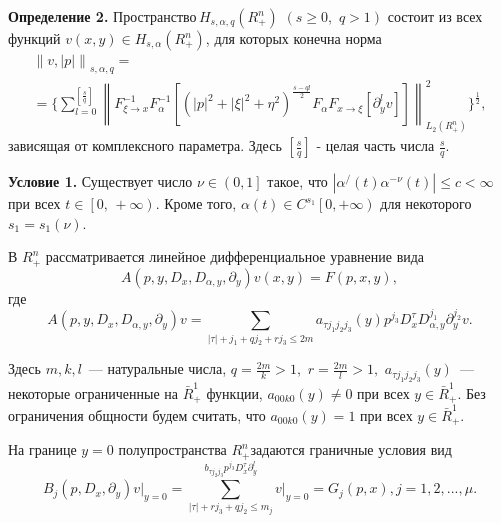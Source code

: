 \textbf{Определение 2.} Пространство$\,H_{s,\alpha ,q} (R_ + ^n )\,\,(s
\geqslant 0,\,\,q > 1)$ состоит из всех функций $v(x,y) \in H_{s,\alpha } (R_ + ^n
)$, для которых конечна норма
\begin{multline*}
\left\| {v,\left| p \right|} \right\|_{s,\alpha ,q} =
\\=
\{\sum\limits_{l =
0}^{[\frac{s}{q}]} {\left\| {F_{\xi \to x}^{ - 1} F_\alpha ^{ - 1} [(\left|
p \right|^2 + \left| \xi \right|^2 + \eta ^2)^{\frac{s - ql}{2}}F_\alpha
F_{x \to \xi } [\partial _y^l v]]} \right\|_{L_2 (R_ + ^n )}^2 }
\}^{\frac{1}{2}},
\end{multline*}
зависящая от комплексного параметра. Здесь $[\frac{s}{q}]$ - целая часть
числа $\frac{s}{q}.$

\textbf{Условие 1.} Существует число $\nu \in \left( {0,1} \right]$ такое,
что
\linebreak
$\left| {\alpha ^ / (t)\alpha ^{ - \nu }(t)} \right| \leqslant c < \infty $
при всех $t \in \left[ {0,\, + \infty } \right)$. Кроме того, $\alpha \left(
t \right) \in C^{s_1 }\left[ {0, + \infty } \right)$ для некоторого $s_1 =
s_1 (\nu )$.

В $R_ + ^n $ рассматривается линейное дифференциальное уравнение вида
\begin{equation}
\label{eq4600}
A(p,y,D_x ,D_{\alpha ,y} ,\partial _y )v(x,y) = F(p,x,y),
\end{equation}
где
\begin{equation}
\label{eq4601}
A(p,y,D_x ,D_{\alpha ,y} ,\partial _y )v = \sum\limits_{\left| \tau \right|
+ j_1 + qj_2 + rj_3 \leqslant 2m} {a_{\tau j_1 j_2 j_3 } (y)p^{j_3 }D_x^\tau
D_{\alpha ,y}^{j_1 } } \partial _y^{j_2 } v.
\end{equation}



Здесь $m,k,l$~--- натуральные числа, $q = \frac{2m}{k} > 1,\,\,r = \frac{2m}{l} >
1,\,\,a_{\tau j_1 j_2 j_3 } (y)$~--- некоторые ограниченные на $\bar {R}_ + ^1
$ функции,
\linebreak
$a_{00k0} (y) \ne 0$ при всех $y \in \bar {R}_ + ^1 .$ Без
ограничения общности будем считать, что $a_{00k0} (y) = 1$ при всех $y \in
\bar {R}_ + ^1 .$

На границе $y = 0$ полупространства $R_ + ^n $задаются граничные условия вид
\begin{equation}
\label{eq4602}
B_j (p,D_x ,\partial _y )\left. v \right|_{y = 0} = \sum\limits_{\left| \tau
\right| + rj_3 + qj_2 \leqslant m_j }^ {b_{\tau j_2 j_3 } p^{j_3 }D_x^\tau
\partial _y^l } \left. v \right|_{y = 0} = G_j (p,x),
j = 1,2,...,\mu .
\end{equation}



